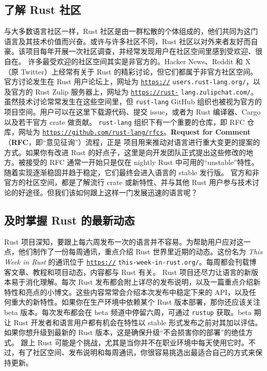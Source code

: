 \subsection{了解 Rust 社区}
\label{idx:idx_d3c83847}
与大多数语言社区一样，Rust 社区是由一群松散的个体组成的，他们共同为这门语言及其技术价值而兴奋。或许与许多社区不同，Rust 社区以对外来者友好而自豪。该项目每年开展一次社区调查，并经常发现用户在社区空间里感到受欢迎、很自在。
许多最受欢迎的社区空间其实是非官方的。Hacker News、Reddit 和 X（原 Twitter）上经常有关于 Rust 的精彩讨论，但它们都属于非官方社区空间。官方讨论发生在 Rust 用户论坛上，网址为 \href{https://}{\texttt{https://}}
\texttt{users.\allowbreak{}rust-\allowbreak{}lang.\allowbreak{}org/\allowbreak{}}，以及官方的 Rust Zulip 服务器上，网址为 \href{https://rust-}{\texttt{https:/\allowbreak{}/\allowbreak{}rust-\allowbreak{}}}
\texttt{lang.\allowbreak{}zulipchat.\allowbreak{}com/\allowbreak{}}。
虽然技术讨论常常发生在这些空间里，但 \texttt{rust-lang} GitHub 组织也被视为官方的项目空间。用户可以在这里下载源代码、提交 issue，或者为 Rust 编译器、Cargo 以及若干官方 crate 做贡献。
\texttt{rust-lang} 组织下有一个重要的仓库，即 RFC 仓库，网址为
\href{https://github.com/rust-lang/rfcs}{\texttt{https:/\allowbreak{}/\allowbreak{}github.\allowbreak{}com/\allowbreak{}rust-\allowbreak{}lang/\allowbreak{}rfcs}}。\textbf{Request for Comment}（\textbf{RFC}，即“意见征询”）流程，正是
项目用来推动对语言进行重大变更的提案的方式。如果你有改进 Rust 的好点子，这里是向开发团队正式提出这些修改的地方。被接受的 RFC 通常一开始只是仅在 nightly Rust 中可用的“unstable”特性。随着实现逐渐稳固并趋于稳定，它们最终会进入语言的 stable 发行版。
\label{idx:idx_4696599e}
官方和非官方的社区空间，都是了解流行 crate 或新特性、并与其他 Rust 用户参与技术讨论的好途径。但我们该如何跟上这样一门发展迅速的语言呢？
\subsection{及时掌握 Rust 的最新动态}
\label{idx:idx_8ef739ac}
Rust 项目深知，要跟上每六周发布一次的语言并不容易。为帮助用户应对这一点，他们制作了一份每周通讯，重点介绍 Rust 世界里近期的动态。这份名为 \emph{This Week in Rust} 的通讯位于 \href{https://}{\texttt{https://}}
\texttt{this-\allowbreak{}week-\allowbreak{}in-\allowbreak{}rust.\allowbreak{}org/\allowbreak{}}。每周都会刊载博客文章、教程和项目动态，内容都与
Rust 有关。
Rust 项目还尽力让语言的新版本易于消化理解。每次 Rust 发布都会附上详尽的发布说明，以及一篇重点介绍新特性和亮点的小博文。这些内容常常会介绍本次发布中稳定下来的 API，以及任何重大的新特性。如果你在生产环境中依赖某个 Rust 版本部署，那你还应该关注 beta 版本。每次发布都会在 beta 频道中停留六周，可通过 \texttt{rustup} 获取。beta 期让 Rust 开发者和语言用户都有机会在特性以 stable 形式发布之前对其加以评估。如果你想升级到最新的 Rust 版本，这是确保升级“不会损害你的部署”的绝佳方式。
\label{idx:idx_b9141d0d}
跟上 Rust 可能是个挑战，尤其是当你并不在职业环境中每天使用它时。不过，有了社区空间、发布说明和每周通讯，你很容易挑选出最适合自己的方式来保持更新。
